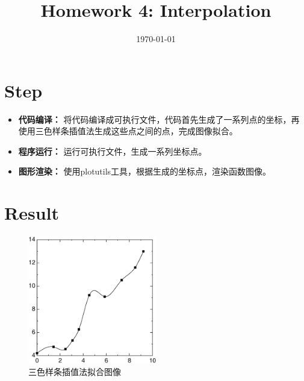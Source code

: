 \documentclass[12pt, a4paper, oneside]{ctexart}
\title{\textbf{Homework 4: Interpolation}}
\date{\today}
\begin{document}
\maketitle


\section{Step}
\begin{itemize}
    \item \textbf{代码编译：} 将代码编译成可执行文件，代码首先生成了一系列点的坐标，再使用三色样条插值法生成这些点之间的点，完成图像拟合。 
    \item \textbf{程序运行：} 运行可执行文件，生成一系列坐标点。
    \item \textbf{图形渲染：} 使用plotutils工具，根据生成的坐标点，渲染函数图像。
    
\end{itemize}
\section{Result}
    \begin{figure}[ht]
    \centering
    \includegraphics[width=0.5\textwidth]{./interp.eps}
    \caption{三色样条插值法拟合图像}
    \end{figure}
\end{document}
